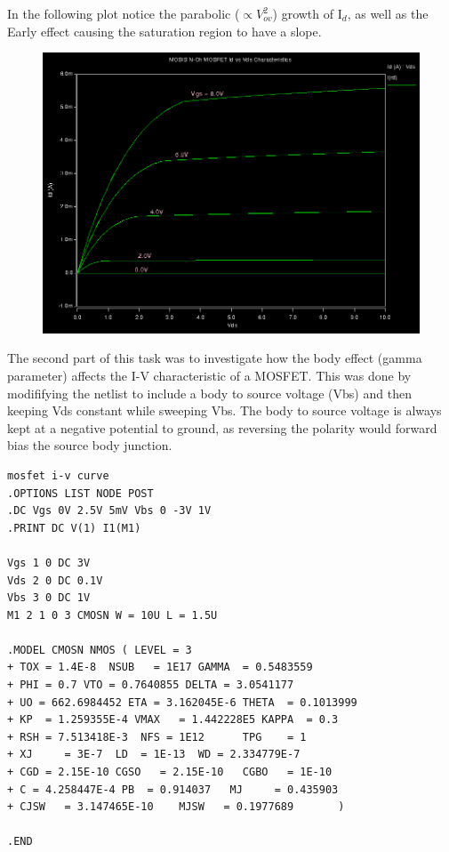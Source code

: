 \documentclass[12pt]{article}
\begin{document}
In the following plot notice the parabolic ($\propto V_{ov}^2$) growth of I$_d$, as well as the Early effect causing the saturation region to have a slope.
\FloatBarrier
\begin{figure}[h!]
\begin{center}
 \includegraphics[scale=0.35]{./mftiv.png}
\end{center}
\end{figure}
\FloatBarrier
The second part of this task was to investigate how the body effect (gamma parameter) affects the I-V characteristic of a MOSFET. This was done by modififying the netlist to include a body to source voltage (Vbs) and then keeping Vds constant while sweeping Vbs. The body to source voltage is always kept at a negative potential to ground, as reversing the polarity would forward bias the source body junction.
\begin{lstlisting}
mosfet i-v curve
.OPTIONS LIST NODE POST
.DC Vgs 0V 2.5V 5mV	Vbs 0 -3V 1V
.PRINT DC V(1) I1(M1)

Vgs 1 0 DC 3V
Vds 2 0 DC 0.1V
Vbs 3 0 DC 1V
M1 2 1 0 3 CMOSN W = 10U L = 1.5U

.MODEL CMOSN NMOS ( LEVEL = 3 
+ TOX = 1.4E-8  NSUB   = 1E17 GAMMA  = 0.5483559          
+ PHI = 0.7 VTO = 0.7640855 DELTA = 3.0541177 
+ UO = 662.6984452 ETA = 3.162045E-6 THETA  = 0.1013999          
+ KP  = 1.259355E-4 VMAX   = 1.442228E5 KAPPA  = 0.3             
+ RSH = 7.513418E-3  NFS = 1E12      TPG    = 1                     
+ XJ     = 3E-7  LD  = 1E-13  WD = 2.334779E-7
+ CGD = 2.15E-10 CGSO   = 2.15E-10   CGBO   = 1E-10        
+ C = 4.258447E-4 PB  = 0.914037   MJ     = 0.435903 
+ CJSW   = 3.147465E-10    MJSW   = 0.1977689       )                                     

.END
\end{lstlisting}
\end{document}
